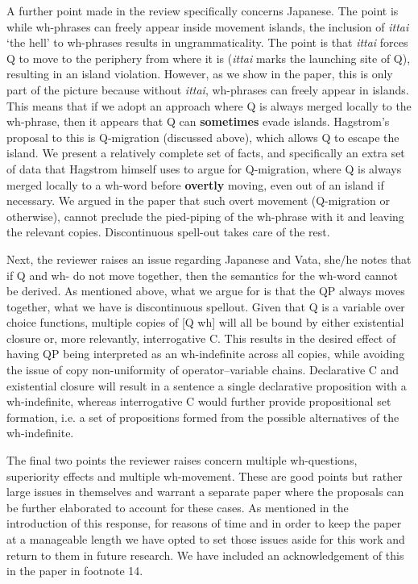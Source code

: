 \documentclass[11pt]{article}
\begin{document}
A further point made in the review specifically concerns Japanese. The point is while wh-phrases can freely appear inside movement islands, the inclusion of \textit{ittai} `the hell' to wh-phrases results in ungrammaticality. The point is that \textit{ittai} forces Q to move to the periphery from where it is (\textit{ittai} marks the launching site of Q), resulting in an island violation. However, as we show in the paper, this is only part of the picture because without \textit{ittai}, wh-phrases can freely appear in islands. This means that if we adopt an approach where Q is always merged locally to the wh-phrase, then it appears that Q can \textbf{sometimes} evade islands. Hagstrom's proposal to this is Q-migration (discussed above), which allows Q to escape the island. We present a relatively complete set of facts, and specifically an extra set of data that Hagstrom himself uses to argue for Q-migration, where Q is always merged locally to a wh-word before \textbf{overtly} moving, even out of an island if necessary. We argued in the paper that such overt movement (Q-migration or otherwise), cannot preclude the pied-piping of the wh-phrase with it and leaving the relevant copies. Discontinuous spell-out takes care of the rest.

Next, the reviewer raises an issue regarding  Japanese and Vata, she/he notes that if Q and wh- do not move together, then the semantics for the wh-word cannot be derived. As mentioned above, what we argue for is that the QP always moves together, what we have is discontinuous spellout. Given that Q is a variable over choice functions, multiple copies of [Q wh] will all be bound by either existential closure or, more relevantly, interrogative C. This results in the desired effect of having QP being interpreted as an wh-indefinite across all copies, while avoiding the issue of copy non-uniformity of operator--variable chains. Declarative C and existential closure will result in a sentence a single declarative proposition with a wh-indefinite, whereas interrogative C would further provide propositional set formation, i.e. a set of propositions formed from the possible alternatives of the wh-indefinite.

The final two points the reviewer raises concern multiple wh-questions, superiority effects and multiple wh-movement. These are good points but rather large issues in themselves and warrant a separate paper where the proposals can be further elaborated to account for these cases. As mentioned in the introduction of this response, for reasons of time and in order to keep the paper at a manageable length we have opted to set those issues aside for this work and return to them in future research. We have included an acknowledgement of this in the paper in footnote 14.
\end{document}
